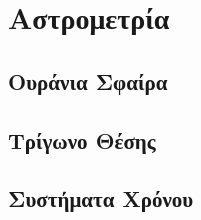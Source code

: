 \chapter{Αστρομετρία}
\label{ch:Chapter1}



\section{Ουράνια Σφαίρα}
\label{sec:SectionName1}



\section{Τρίγωνο Θέσης}
\label{sec:SectionName2}






\section{Συστήματα Χρόνου}
\label{sec:SectionName3}

